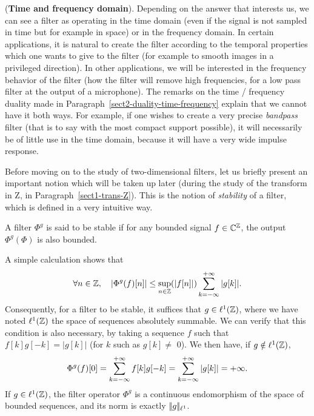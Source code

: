  
 
 
 
\begin{rem}{(\upshape \textbf{Time and frequency domain}).} 
  Depending on the answer that interests us, we can see a filter as operating in the time domain (even if the signal is not sampled in time but for example in space) or in the frequency domain. In certain applications, it is natural to create the filter according to the temporal properties which one wants to give to the filter (for example to smooth images in a privileged direction). In other applications, we will be interested in the frequency behavior of the filter (how the filter will remove high frequencies, for a low pass filter at the output of a microphone). The remarks on the time / frequency duality made in Paragraph~\ref{sect2-duality-time-frequency} explain that we cannot have it both ways. For example, if one wishes to create a very precise \textit{bandpass} filter (that is to say with the most compact support possible), it will necessarily be of little use in the time domain, because it will have a very wide impulse response.
\end{rem}
 
 
 
\label{notation-54} Before moving on to the study of two-dimensional filters, let us briefly present an important notion which will be taken up later (during the study of the transform in Z, in Paragraph~\ref{sect1-trans-Z}). This is the notion of \textit{stability} of a filter, which is defined in a very intuitive way.
 
\begin{defn}[Stability]
 A filter $ \Phi^g $ is said to be stable if for any bounded signal $ f \in \mathbb{C}^{\mathbb{Z}} $, the output $ \Phi^g (\Phi) $ is also bounded.
\end{defn}
A simple calculation shows that
\begin{equation*}
\forall n \in \mathbb{Z}, \quad | \Phi^g (f) [n] | \leq \sup_{n \in \mathbb{Z}} (| f [n] |) \sum_{k = -\infty}^{+\infty}{| g [k] |}.
\end{equation*}
Consequently, for a filter to be stable, it suffices that $ g \in \ell^1 (\mathbb{Z}) $, where we have noted $ \ell^1 (\mathbb{Z}) $ the space of sequences absolutely summable. We can verify that this condition is also necessary, by taking a sequence $ f $ such that $ f [k] g [-k] = | g [k] | $ (for $ k $ such as $ g [k] \neq $ 0). We then have, if $ g \notin \ell^1 (\mathbb{Z}) $,
\begin{equation*}
\Phi^g (f) [0] = \sum_{k = -\infty}^{+\infty}{f [k] g [-k]} = \sum_{k = -\infty}^{+\infty}{| g [k] |} = + \infty.
\end{equation*}
If $ g \in \ell^1 (\mathbb{Z}) $, the filter operator $ \Phi^g $ is a continuous endomorphism of the space of bounded sequences, and its norm is exactly $ |\!| g |\!|_{\ell^1} $.
 
